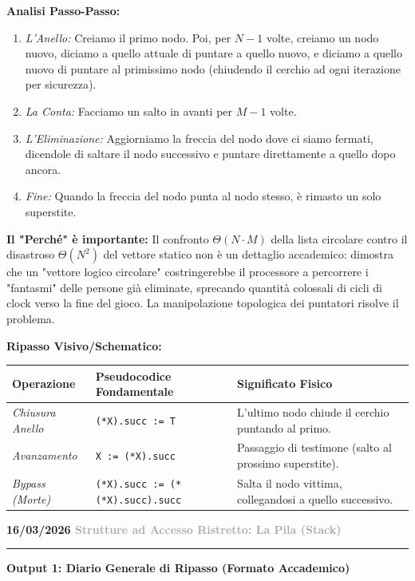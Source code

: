 \documentclass[a4paper, 11pt]{report}
\newcommand{\lezione}[2]{
\vspace{2em}
\noindent\textbf{\Large #1 \hfill \textcolor{darkgray}{#2}}
\vspace{0.5em}
\hrule
\vspace{1.5em}
}
\begin{document}
\textbf{Analisi Passo-Passo:}
\begin{enumerate}
    \item \textit{L'Anello:} Creiamo il primo nodo. Poi, per $N-1$ volte, creiamo un nodo nuovo, diciamo a quello attuale di puntare a quello nuovo, e diciamo a quello nuovo di puntare al primissimo nodo (chiudendo il cerchio ad ogni iterazione per sicurezza).
    \item \textit{La Conta:} Facciamo un salto in avanti per $M-1$ volte.
    \item \textit{L'Eliminazione:} Aggiorniamo la freccia del nodo dove ci siamo fermati, dicendole di saltare il nodo successivo e puntare direttamente a quello dopo ancora.
    \item \textit{Fine:} Quando la freccia del nodo punta al nodo stesso, è rimasto un solo superstite.
\end{enumerate}

\textbf{Il "Perché" è importante:}
Il confronto $\Theta(N \cdot M)$ della lista circolare contro il disastroso $\Theta(N^2)$ del vettore statico non è un dettaglio accademico: dimostra che un "vettore logico circolare" costringerebbe il processore a percorrere i "fantasmi" delle persone già eliminate, sprecando quantità colossali di cicli di clock verso la fine del gioco. La manipolazione topologica dei puntatori risolve il problema.

\textbf{Ripasso Visivo/Schematico:}
\begin{center}
\begin{tabular}{|l|l|p{7cm}|}
\hline
\textbf{Operazione} & \textbf{Pseudocodice Fondamentale} & \textbf{Significato Fisico} \\
\hline
\textit{Chiusura Anello} & \texttt{(*X).succ := T} & L'ultimo nodo chiude il cerchio puntando al primo. \\
\hline
\textit{Avanzamento} & \texttt{X := (*X).succ} & Passaggio di testimone (salto al prossimo superstite). \\
\hline
\textit{Bypass (Morte)} & \texttt{(*X).succ := (*(*X).succ).succ} & Salta il nodo vittima, collegandosi a quello successivo. \\
\hline
\end{tabular}
\end{center}


\lezione{16/03/2026}{Strutture ad Accesso Ristretto: La Pila (Stack)}

\vspace{0.5cm}
\textbf{Output 1: Diario Generale di Ripasso (Formato Accademico)}
\end{document}
